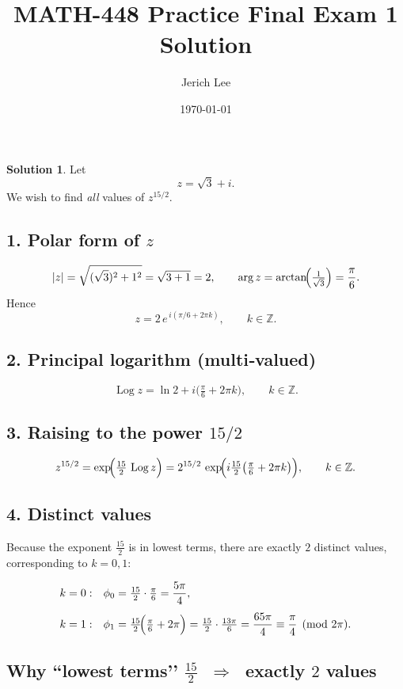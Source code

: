 \documentclass[12pt]{article}
\title{MATH-448 Practice Final Exam 1 Solution}
\author{Jerich Lee}
\date{\today}
\DeclareMathOperator{\Log}{Log}
\theoremstyle{definition} %
\newtheorem{solution}{Solution}
\theoremstyle{plain} %
\begin{document}
\maketitle
\begin{solution}
  Let 
  \[
    z = \sqrt{3}+i .
  \]
  We wish to find \emph{all} values of \(z^{15/2}\).
  
  \subsection*{1.  Polar form of \(z\)}
  \[
    |z| = \sqrt{(\sqrt{3})^{2}+1^{2}} = \sqrt{3+1}=2,
    \qquad
    \arg z = \arctan\!\Bigl(\tfrac{1}{\sqrt{3}}\Bigr)=\frac{\pi}{6}.
  \]
  Hence
  \[
    z = 2\,e^{\,i(\pi/6+2\pi k)}, 
    \qquad k\in\mathbb{Z}.
  \]
  
  \subsection*{2.  Principal logarithm (multi‑valued)}
  \[
    \Log z=\ln 2 + i\bigl(\tfrac{\pi}{6}+2\pi k\bigr), 
    \qquad k\in\mathbb{Z}.
  \]
  
  \subsection*{3.  Raising to the power \(15/2\)}
  \[
    z^{15/2} 
    = \exp\!\Bigl(\tfrac{15}{2}\,\Log z\Bigr)
    = 2^{15/2}\,
      \exp\!\Bigl(i\tfrac{15}{2}\bigl(\tfrac{\pi}{6}+2\pi k\bigr)\Bigr),
    \qquad k\in\mathbb{Z}.
  \]
  
  
  \subsection*{4.  Distinct values}
  Because the exponent \(\tfrac{15}{2}\) is in lowest terms, there are exactly
  \(2\) distinct values, corresponding to \(k=0,1\):
  
  \[
  \begin{aligned}
  k &= 0: &
  \phi_0 &= \tfrac{15}{2}\cdot\tfrac{\pi}{6}= \frac{5\pi}{4},
  \\[4pt]
  k &= 1: &
  \phi_1 &= \tfrac{15}{2}\!\Bigl(\tfrac{\pi}{6}+2\pi\Bigr)
         =\tfrac{15}{2}\cdot\tfrac{13\pi}{6}
         =\frac{65\pi}{4}
         \equiv \frac{\pi}{4}\pmod{2\pi}.
  \end{aligned}
  \]
  \subsection*{Why “lowest terms’’ \(\displaystyle\frac{15}{2}\) $\;\Longrightarrow\;$ exactly \(2\) values}


\end{solution}
\end{document}
